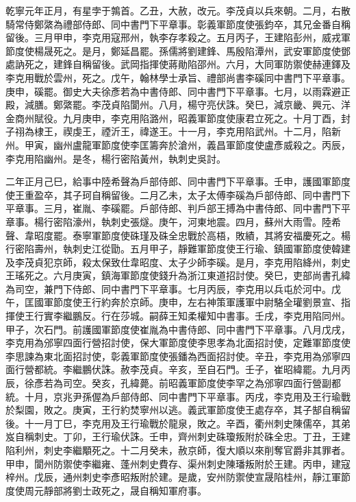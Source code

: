 \begin{pinyinscope}
 乾寧元年正月，有星孛于鶉首。乙丑，大赦，改元。李茂貞以兵來朝。二月，右散騎常侍鄭綮為禮部侍郎、同中書門下平章事。彰義軍節度使張鈞卒，其兄金番自稱留後。三月甲申，李克用寇邢州，執李存孝殺之。五月丙子，王建陷彭州，威戎軍節度使楊晟死之。是月，鄭延昌罷。孫儒將劉建鋒、馬殷陷潭州，武安軍節度使鄧處訥死之，建鋒自稱留後。武岡指揮使蔣勛陷邵州。六月，大同軍防禦使赫連鐸及李克用戰於雲州，死之。戊午，翰林學士承旨、禮部尚書李磎同中書門下平章事。庚申，磎罷。御史大夫徐彥若為中書侍郎、同中書門下平章事。七月，以雨霖避正殿，減膳。鄭綮罷。李茂貞陷閬州。八月，楊守亮伏誅。癸巳，減京畿、興元、洋金商州賦役。九月庚申，李克用陷潞州，昭義軍節度使康君立死之。十月丁酉，封子祤為棣王，禊虔王，禋沂王，禕遂王。十一月，李克用陷武州。十二月，陷新州。甲寅，幽州盧龍軍節度使李匡籌奔於滄州，義昌軍節度使盧彥威殺之。丙辰，李克用陷幽州。是冬，楊行密陷黃州，執刺史吳討。



 二年正月己巳，給事中陸希聲為戶部侍郎、同中書門下平章事。壬申，護國軍節度使王重盈卒，其子珂自稱留後。二月乙未，太子太傅李磎為戶部侍郎、同中書門下平章事。三月，崔胤、李磎罷。戶部侍郎、判戶部王搏為中書侍郎、同中書門下平章事。楊行密陷濠州，執刺史張燧。庚午，河東地震。四月，蘇州大雨雪。陸希聲、韋昭度罷。泰寧軍節度使硃瑾及硃全忠戰於高梧，敗績，其將安福慶死之。楊行密陷壽州，執刺史江從勖。五月甲子，靜難軍節度使王行瑜、鎮國軍節度使韓建及李茂貞犯京師，殺太保致仕韋昭度、太子少師李磎。是月，李克用陷絳州，刺史王瑤死之。六月庚寅，鎮海軍節度使錢升為浙江東道招討使。癸巳，吏部尚書孔緯為司空，兼門下侍郎、同中書門下平章事。七月丙辰，李克用以兵屯於河中。戊午，匡國軍節度使王行約奔於京師。庚申，左右神策軍護軍中尉駱全瓘劉景宣、指揮使王行實李繼鵬反。行在莎城。嗣薛王知柔權知中書事。壬戌，李克用陷同州。甲子，次石門。前護國軍節度使崔胤為中書侍郎、同中書門下平章事。八月戊戌，李克用為邠寧四面行營招討使，保大軍節度使李思孝為北面招討使，定難軍節度使李思諫為東北面招討使，彰義軍節度使張鐇為西面招討使。辛丑，李克用為邠寧四面行營都統。李繼鵬伏誅。赦李茂貞。辛亥，至自石門。壬子，崔昭緯罷。九月丙辰，徐彥若為司空。癸亥，孔緯薨。前昭義軍節度使李罕之為邠寧四面行營副都統。十月，京兆尹孫偓為戶部侍郎、同中書門下平章事。丙戌，李克用及王行瑜戰於梨園，敗之。庚寅，王行約焚寧州以逃。義武軍節度使王處存卒，其子郜自稱留後。十一月丁巳，李克用及王行瑜戰於龍泉，敗之。辛酉，衢州刺史陳儒卒，其弟岌自稱刺史。丁卯，王行瑜伏誅。壬申，齊州刺史硃瓊叛附於硃全忠。丁丑，王建陷利州，刺史李繼顒死之。十二月癸未，赦京師，復大順以來削奪官爵非其罪者。甲申，閬州防禦使李繼雍、蓬州刺史費存、渠州刺史陳璠叛附於王建。丙申，建寇梓州。戊辰，通州刺史李彥昭叛附於建。是歲，安州防禦使宣晟陷桂州，靜江軍節度使周元靜部將劉士政死之，晟自稱知軍府事。




\end{pinyinscope}
